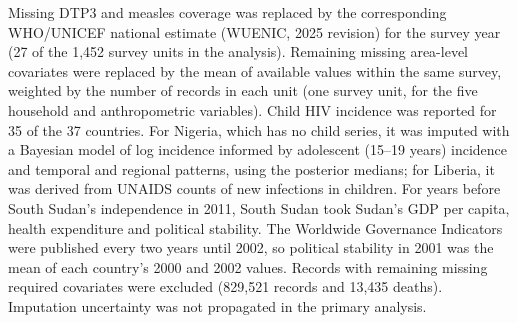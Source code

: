 Missing DTP3 and measles coverage was replaced by the corresponding WHO/UNICEF national estimate (WUENIC, 2025 revision) for the survey year (27 of the 1,452 survey units in the analysis). Remaining missing area-level covariates were replaced by the mean of available values within the same survey, weighted by the number of records in each unit (one survey unit, for the five household and anthropometric variables). Child HIV incidence was reported for 35 of the 37 countries. For Nigeria, which has no child series, it was imputed with a Bayesian model of log incidence informed by adolescent (15--19 years) incidence and temporal and regional patterns, using the posterior medians; for Liberia, it was derived from UNAIDS counts of new infections in children. For years before South Sudan's independence in 2011, South Sudan took Sudan's GDP per capita, health expenditure and political stability. The Worldwide Governance Indicators were published every two years until 2002, so political stability in 2001 was the mean of each country's 2000 and 2002 values. Records with remaining missing required covariates were excluded (829,521 records and 13,435 deaths). Imputation uncertainty was not propagated in the primary analysis.
